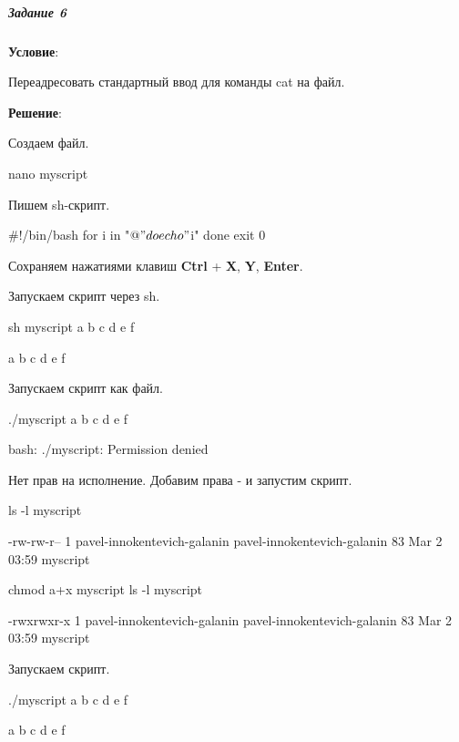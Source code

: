 \subparagraph{Задание 6} \textbf{Условие}:

Переадресовать стандартный ввод для команды cat на файл.

\textbf{Решение}:

Создаем файл.

\begin{BashBox}
nano myscript
\end{BashBox}

Пишем sh-скрипт.

\begin{BashBox}
#!/bin/bash
for i in "$@"
    do
    echo "$i"
done
exit 0
\end{BashBox}

Сохраняем нажатиями клавиш \textbf{Ctrl} + \textbf{X}, \textbf{Y}, \textbf{Enter}.

Запускаем скрипт через sh.

\begin{BashBox}
sh myscript a b c d e f
\end{BashBox}

\begin{OutBox}
a
b
c
d
e
f
\end{OutBox}

Запускаем скрипт как файл.

\begin{BashBox}
./myscript a b c d e f
\end{BashBox}

\begin{OutBox}
bash: ./myscript: Permission denied
\end{OutBox}

Нет прав на исполнение. Добавим права - и запустим скрипт.

\begin{BashBox}
ls -l myscript
\end{BashBox}

\begin{OutBox}
-rw-rw-r-- 1 pavel-innokentevich-galanin pavel-innokentevich-galanin 83 Mar  2 03:59 myscript
\end{OutBox}

\begin{BashBox}
chmod a+x myscript
ls -l myscript
\end{BashBox}

\begin{OutBox}
-rwxrwxr-x 1 pavel-innokentevich-galanin pavel-innokentevich-galanin 83 Mar  2 03:59 myscript
\end{OutBox}

Запускаем скрипт.

\begin{BashBox}
./myscript a b c d e f
\end{BashBox}

\begin{OutBox}
a
b
c
d
e
f
\end{OutBox}
